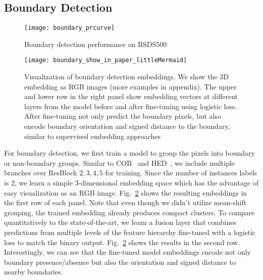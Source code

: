 \documentclass[10pt,twocolumn,letterpaper]{article}
\begin{document}
\subsection{Boundary Detection}\begin{figure}[t]
\centering
   \texttt{[image: boundary\_prcurve]}
   \vspace{-2mm}
   \caption{Boundary detection performance on BSDS500}
\label{fig:boundary_prcurve}
\vspace{-3mm}
\end{figure}\begin{figure}[t]
\centering
   \texttt{[image: boundary\_show\_in\_paper\_littleMermaid]}
\vspace{-5mm}
   \caption{
   Visualization of boundary detection embeddings.  We show the 3D embedding as
   RGB images (more examples in appendix).  The upper and lower row in the
   right panel show embedding vectors at different layers from the model before
   and after fine-tuning using logistic loss.  After fine-tuning not only
   predict the boundary pixels, but also encode boundary orientation and signed
   distance to the boundary, similar to supervised embedding approaches
   \cite{sironi2014multiscale,uhrig2016pixel,bai2016deep}
   }
\label{fig:boundary_show_in_paper}
\vspace{-2mm}
\end{figure}For boundary detection, we first train a model to group the pixels into
boundary or non-boundary groups.  Similar to
COB~\cite{maninis2017convolutional} and HED~\cite{xie2015holistically}, we
include multiple branches over ResBlock $2, 3, 4, 5$ for training.
Since the number of instances labels is 2, we learn a simple 3-dimensional
embedding space which has the advantage of easy visualization as an RGB
image.  Fig.~\ref{fig:boundary_show_in_paper} shows the resulting embeddings
in the first row of each panel.  Note that even though we didn't utilize
mean-shift grouping, the trained embedding already produces compact clusters.
To compare quantitatively to the state-of-the-art, we learn a fusion
layer that combines predictions from multiple levels of the feature
hierarchy fine-tuned with a logistic loss to match the binary output.
Fig.~\ref{fig:boundary_show_in_paper} shows the results in the second row.
Interestingly, we can see that the fine-tuned model embeddings
encode not only boundary presence/absence but also the orientation
and signed distance to nearby boundaries.
\end{document}
